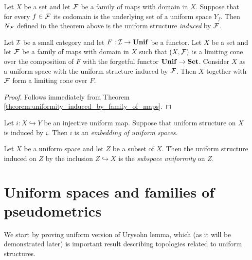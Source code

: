 \documentclass[10pt]{amsart}
\begin{document}
\begin{definition}
	Let $X$ be a set and let ${\mathcal F}$ be a family of maps with domain in $X$. Suppose that for every $f \in {\mathcal F}$ its codomain is the underlying set of a uniform space $Y_f$. Then $N_{{\mathcal F}}$ defined in the theorem above is the uniform structure \textit{induced} by ${\mathcal F}$.
\end{definition}

\begin{corollary}\label{corollary:limits_in_category_of_uniform_spaces}
	Let ${\mathcal I}$ be a small category and let $F:{\mathcal I} \rightarrow \mathbf{Unif}$ be a functor. Let $X$ be a set and let ${\mathcal F}$ be a family of maps with domain in $X$ such that $(X,{\mathcal F})$ is a limiting cone over the composition of $F$ with the forgetful functor $\mathbf{Unif} \rightarrow \mathbf{Set}$. Consider $X$ as a uniform space with the uniform structure induced by ${\mathcal F}$. Then $X$ together with ${\mathcal F}$ form a limiting cone over $F$.
\end{corollary}
\begin{proof}
	Follows immediately from Theorem \ref{theorem:uniformity_induced_by_family_of_maps}.
\end{proof}

\begin{definition}
	Let $i:X \hookrightarrow Y$ be an injective uniform map. Suppose that uniform structure on $X$ is induced by $i$. Then $i$ is an \textit{embedding of uniform spaces}.
\end{definition}

\begin{definition}
	Let $X$ be a uniform space and let $Z$ be a subset of $X$. Then the uniform structure induced on $Z$ by the inclusion $Z\hookrightarrow X$ is the \textit{subspace uniformity} on $Z$.
\end{definition}

\section{Uniform spaces and families of pseudometrics}
\noindent
We start by proving uniform version of Urysohn lemma, which (as it will be demonstrated later) is important result describing topologies related to uniform structures.
\end{document}
